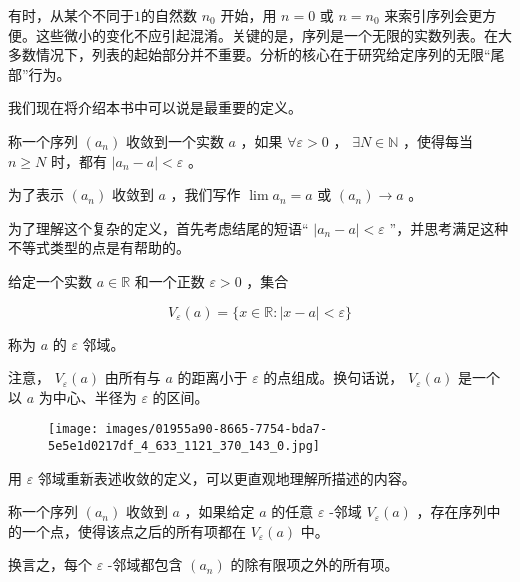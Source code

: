 有时，从某个不同于$1$的自然数 \({n}_{0}\) 开始，用 \(n = 0\) 或 \(n = {n}_{0}\) 来索引序列会更方便。这些微小的变化不应引起混淆。关键的是，序列是一个无限的实数列表。在大多数情况下，列表的起始部分并不重要。分析的核心在于研究给定序列的无限“尾部”行为。

我们现在将介绍本书中可以说是最重要的定义。


\begin{Def}[序列的收敛性]
  \label{def:2.2.3}
  称一个序列 \(\left( {a}_{n}\right)\) 收敛到一个实数 \(a\) ，如果 \(\forall \varepsilon>0\) ， \(\exists N \in  \mathbb{N}\) ，使得每当 \(n \geq  N\) 时，都有 \(\left| {{a}_{n} - a}\right|  < \varepsilon\) 。

  为了表示 \(\left( {a}_{n}\right)\) 收敛到 \(a\) ，我们写作 \(\lim {a}_{n} = a\) 或 \(\left( {a}_{n}\right)  \rightarrow  a\) 。
\end{Def}




为了理解这个复杂的定义，首先考虑结尾的短语“ \(\left| {{a}_{n} - a}\right|  < \varepsilon\) ”，并思考满足这种不等式类型的点是有帮助的。

\begin{Def}
  \label{def:2.2.4}
  给定一个实数 \(a \in  \mathbb{R}\) 和一个正数 \(\varepsilon  > 0\) ，集合

\[
{V}_{\varepsilon }\left( a\right)  = \{ x \in  \mathbb{R} : \left| {x - a}\right|  < \varepsilon \}
\]

称为 \(a\) 的 \(\varepsilon\) 邻域。
\end{Def}


注意， \({V}_{\varepsilon }\left( a\right)\) 由所有与 \(a\) 的距离小于 \(\varepsilon\) 的点组成。换句话说， \({V}_{\varepsilon }\left( a\right)\) 是一个以 \(a\) 为中心、半径为 \(\varepsilon\) 的区间。

\begin{figure}[h]
  \centering
  \texttt{[image: images/01955a90-8665-7754-bda7-5e5e1d0217df\_4\_633\_1121\_370\_143\_0.jpg]}
\end{figure}



用 \(\varepsilon\) 邻域重新表述收敛的定义，可以更直观地理解所描述的内容。

\addtocounter{Thm}{-2}

\begin{Def}
  称一个序列 \(\left( {a}_{n}\right)\) 收敛到 \(a\) ，如果给定 \(a\) 的任意 \(\varepsilon\) -邻域 \({V}_{\varepsilon }\left( a\right)\) ，存在序列中的一个点，使得该点之后的所有项都在 \({V}_{\varepsilon }\left( a\right)\) 中。
\end{Def}
换言之，每个 \(\varepsilon\) -邻域都包含 \(\left( {a}_{n}\right)\) 的除有限项之外的所有项。

